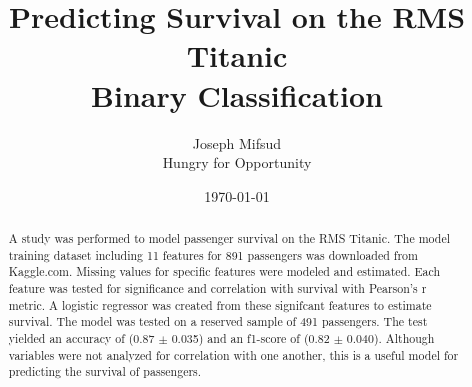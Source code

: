 \documentclass[10pt]{article}
\title{Predicting Survival on the RMS Titanic\\
	\large{Binary Classification}}
\author{	Joseph Mifsud  \\
		Hungry for Opportunity}
\date{\today}
\begin{document}
\maketitle
\begin{abstract}

	A study was performed to model passenger survival on the RMS Titanic.
	The model training dataset including 11 features for 891 passengers was downloaded from Kaggle.com.
	Missing values for specific features were modeled and estimated.
	Each feature was tested for significance and correlation with survival with Pearson's r metric.
	A logistic regressor was created from these signifcant features to estimate survival.
	The model was tested on a reserved sample of 491 passengers.
	The test yielded an accuracy of (0.87 $\pm$ 0.035) and an f1-score of (0.82 $\pm$ 0.040).
	Although variables were not analyzed for correlation with one another, this is a useful model for predicting the survival of passengers.

\end{abstract}
\pagebreak
\end{document}
